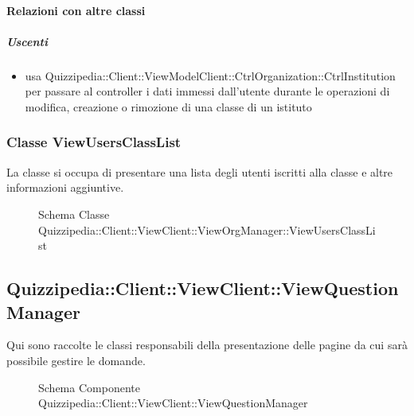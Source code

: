 \paragraph{Relazioni con altre classi}
\subparagraph{Uscenti}
\begin{itemize}
\item usa Quizzipedia::Client::ViewModelClient::CtrlOrganization::CtrlInstitution per passare al controller i dati immessi dall'utente durante le operazioni di modifica, creazione o rimozione di una classe di un istituto
\end{itemize}
\subsubsection{Classe ViewUsersClassList}
La classe si occupa di presentare una lista degli utenti iscritti alla classe e altre informazioni aggiuntive.
\begin{figure}[H]
\centering
\noindent{}
\caption[Schema Classe ViewUsersClassList]{Schema Classe Quizzipedia::Client::ViewClient::ViewOrgManager::ViewUsersClassList}
\end{figure}
\subsection{Quizzipedia::Client::ViewClient::ViewQuestionManager}
Qui sono raccolte le classi responsabili della presentazione delle pagine da cui sarà possibile gestire le domande.
\begin{figure}[H]
\centering
\noindent{}
\caption[Schema Componente Quizzipedia::Client::ViewClient::ViewQuestionManager]{Schema Componente Quizzipedia::Client::ViewClient::ViewQuestionManager}
\end{figure}
